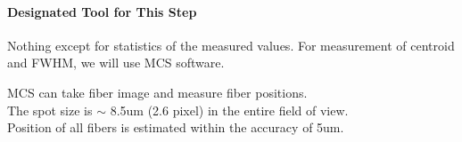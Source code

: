 \paragraph{Designated Tool for This Step}
Nothing except for statistics of the measured values.
For measurement of centroid and FWHM, we will use MCS software.


\begin{itembox}[l]{}
MCS can take fiber image and measure fiber positions. \\
The spot size is $\sim$ 8.5um (2.6 pixel) in the entire field of view. \\
Position of all fibers is estimated within the accuracy of 5um.

\end{itembox}